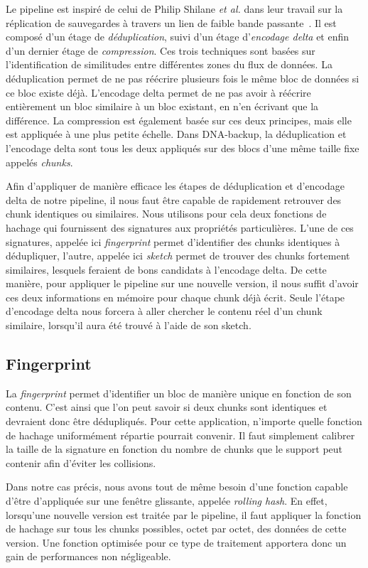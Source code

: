 \documentclass[a4paper]{report}
\makeatletter
\newcommand{\etal}{\emph{et al.}\@\xspace}
\makeatother
\begin{document}
Le pipeline est inspiré de celui de Philip Shilane \etal
dans leur travail sur la réplication de sauvegardes à travers un lien de faible bande passante~\cite{shilane2012wan}.
Il est composé d'un étage de \emph{déduplication}, suivi d'un étage d'\emph{encodage delta}
et enfin d'un dernier étage de \emph{compression}.
Ces trois techniques sont basées sur l'identification de similitudes entre différentes zones du flux de données.
La déduplication permet de ne pas réécrire plusieurs fois le même bloc de données si ce bloc existe déjà.
L'encodage delta permet de ne pas avoir à réécrire entièrement un bloc similaire à un bloc existant,
en n'en écrivant que la différence.
La compression est également basée sur ces deux principes, mais elle est appliquée à une plus petite échelle.
Dans DNA-backup, la déduplication et l'encodage delta sont tous les deux appliqués sur des blocs d'une même taille fixe appelés \emph{chunks}.

Afin d'appliquer de manière efficace les étapes de déduplication et d'encodage delta de notre pipeline,
il nous faut être capable de rapidement retrouver des chunk identiques ou similaires.
Nous utilisons pour cela deux fonctions de hachage qui fournissent des signatures aux propriétés particulières.
L'une de ces signatures, appelée ici \emph{fingerprint} permet d'identifier des chunks identiques à dédupliquer,
l'autre, appelée ici \emph{sketch} permet de trouver des chunks fortement similaires,
lesquels feraient de bons candidats à l'encodage delta.
De cette manière, pour appliquer le pipeline sur une nouvelle version,
il nous suffit d'avoir ces deux informations en mémoire pour chaque chunk déjà écrit.
Seule l'étape d'encodage delta nous forcera à aller chercher le contenu réel d'un chunk similaire,
lorsqu'il aura été trouvé à l'aide de son sketch.

\subsection{Fingerprint}

La \emph{fingerprint} permet d'identifier un bloc de manière unique en fonction de son contenu.
C'est ainsi que l'on peut savoir si deux chunks sont identiques et devraient donc être dédupliqués.
Pour cette application, n'importe quelle fonction de hachage uniformément répartie pourrait convenir.
Il faut simplement calibrer la taille de la signature en fonction du nombre de chunks que le support peut contenir afin d'éviter les collisions.

Dans notre cas précis, nous avons tout de même besoin d'une fonction capable d'être d'appliquée sur une fenêtre glissante, appelée \emph{rolling hash}.
En effet, lorsqu'une nouvelle version est traitée par le pipeline,
il faut appliquer la fonction de hachage sur tous les chunks possibles, octet par octet, des données de cette version.
Une fonction optimisée pour ce type de traitement apportera donc un gain de performances non négligeable.
\end{document}
